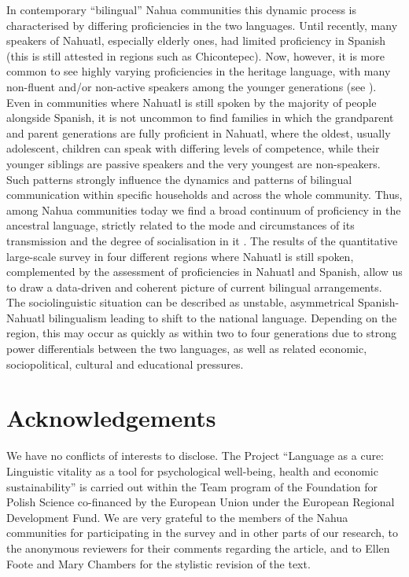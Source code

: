 \documentclass[output=paper,hidelinks]{langscibook}
\begin{document}
In contemporary ``bilingual'' Nahua communities this dynamic process is characterised by differing proficiencies in the two languages. Until recently, many speakers of Nahuatl, especially elderly ones, had limited proficiency in Spanish (this is still attested in regions such as Chicontepec). Now, however, it is more common to see highly varying proficiencies in the heritage language, with many non-fluent and/or non-active speakers among the younger generations (see \citealt{Dorian1981, dorian1986, grinevald1998}). Even in communities where Nahuatl is still spoken by the majority of people alongside Spanish, it is not uncommon to find families in which the grandparent and parent generations are fully proficient in Nahuatl, where the oldest, usually adolescent, children can speak with differing levels of competence, while their younger siblings are passive speakers and the very youngest are non-speakers. Such patterns strongly influence the dynamics and patterns of bilingual communication within specific households and across the whole community. Thus, among Nahua communities today we find a broad continuum of proficiency in the ancestral language, strictly related to the mode and circumstances of its transmission and the degree of socialisation in it \citep{olko2018, floresfarfanolko2020}. The results of the quantitative large-scale survey in four different regions where Nahuatl is still spoken, complemented by the assessment of proficiencies in Nahuatl and Spanish, allow us to draw a data-driven and coherent picture of current bilingual arrangements. The sociolinguistic situation can be described as unstable, asymmetrical Spanish-Nahuatl bilingualism leading to shift to the national language. Depending on the region, this may occur as quickly as within two to four generations due to strong power differentials between the two languages, as well as related economic, sociopolitical, cultural and educational pressures.

\section*{Acknowledgements}

We have no conflicts of interests to disclose. The Project “Language as a cure: Linguistic vitality as a tool for psychological well-being, health and economic sustainability” is carried out within the Team program of the Foundation for Polish Science co-financed by the European Union under the European Regional Development Fund. We are very grateful to the members of the Nahua communities for participating in the survey and in other parts of our research, to the anonymous reviewers for their comments regarding the article, and to Ellen Foote and Mary Chambers for the stylistic revision of the text.
\end{document}
